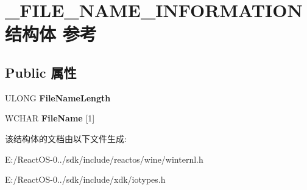 \hypertarget{struct___f_i_l_e___n_a_m_e___i_n_f_o_r_m_a_t_i_o_n}{}\section{\+\_\+\+F\+I\+L\+E\+\_\+\+N\+A\+M\+E\+\_\+\+I\+N\+F\+O\+R\+M\+A\+T\+I\+O\+N结构体 参考}
\label{struct___f_i_l_e___n_a_m_e___i_n_f_o_r_m_a_t_i_o_n}
\subsection*{Public 属性}
\begin{DoxyCompactItemize}
\item 
\mbox{\label{struct___f_i_l_e___n_a_m_e___i_n_f_o_r_m_a_t_i_o_n_a1348c396f32dc614428cd1434f56854a}} 
U\+L\+O\+NG {\bfseries File\+Name\+Length}
\item 
\mbox{\label{struct___f_i_l_e___n_a_m_e___i_n_f_o_r_m_a_t_i_o_n_a9b182e27e4e453f023985629310c686e}} 
W\+C\+H\+AR {\bfseries File\+Name} \mbox{[}1\mbox{]}
\end{DoxyCompactItemize}


该结构体的文档由以下文件生成\+:\begin{DoxyCompactItemize}
\item 
E\+:/\+React\+O\+S-\/0../sdk/include/reactos/wine/winternl.\+h\item 
E\+:/\+React\+O\+S-\/0../sdk/include/xdk/iotypes.\+h\end{DoxyCompactItemize}
